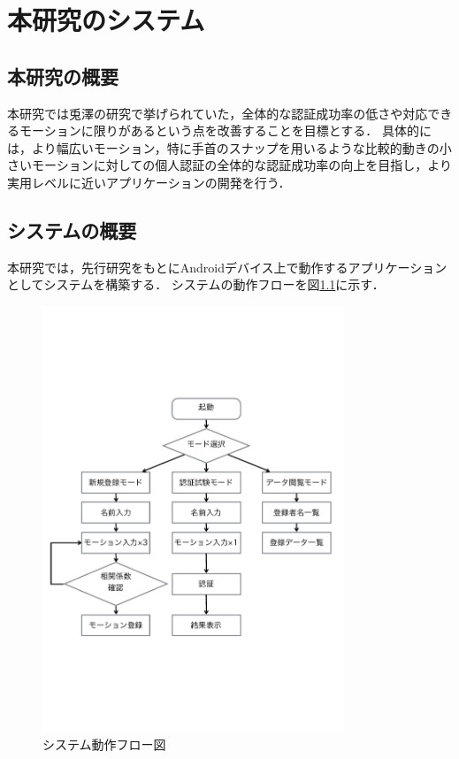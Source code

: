 \documentclass[11pt]{jreport}
\begin{document}
\chapter{本研究のシステム}
	\section{本研究の概要}
	本研究では兎澤の研究で挙げられていた，全体的な認証成功率の低さや対応できるモーションに限りがあるという点を改善することを目標とする．
    具体的には，より幅広いモーション，特に手首のスナップを用いるような比較的動きの小さいモーションに対しての個人認証の全体的な認証成功率の向上を目指し，より実用レベルに近いアプリケーションの開発を行う．

	\section{システムの概要}
	本研究では，先行研究をもとにAndroidデバイス上で動作するアプリケーションとしてシステムを構築する．
    システムの動作フローを図\ref{flow}に示す．

    \begin{figure}[hbtp]
        \begin{center}
            \includegraphics[width=9cm, bb=0 183 594 670]{Flow.pdf}
            \caption{システム動作フロー図}
            \label{flow}
        \end{center}
    \end{figure}
\end{document}
